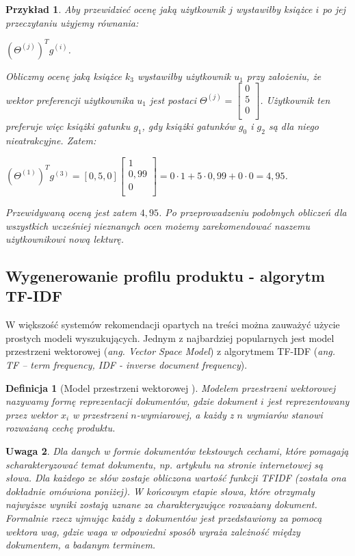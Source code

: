 \documentclass[12pt,a4paper]{report}
\newtheorem{df}{Definicja}[chapter]
\newtheorem{przyklad}{Przykład}[chapter]
\newtheorem{uwaga}[df]{Uwaga}
\begin{document}
\begin{przyklad}
Aby przewidzieć ocenę jaką użytkownik $j$ wystawiłby książce $i$ po jej przeczytaniu użyjemy równania:
\begin{center}
$(\Theta^{(j)})^T g^{(i)}$.
\end{center}
\bigskip
Obliczmy ocenę jaką książce $k_3$ wystawiłby użytkownik $u_1$ przy założeniu, że wektor preferencji użytkownika $u_1$ jest postaci $\Theta^{(j)}= \left[
        \begin{array}{c}
         0 \\
         5 \\
         0 \\
         \end{array}
      \right] $. Użytkownik ten preferuje więc książki gatunku $g_1$, gdy książki gatunków $g_0$ i $g_2$ są dla niego nieatrakcyjne.
Zatem:
\begin{center}
$(\Theta^{(1)})^T g^{(3)} = [0,5,0] \left[
        \begin{array}{c}
         1 \\
         0,99 \\
         0 \\
         \end{array}
      \right] = 0 \cdot 1 + 5 \cdot 0,99 + 0 \cdot 0 = 4,95$.
\end{center}
Przewidywaną oceną jest zatem $4,95$. Po przeprowadzeniu podobnych obliczeń dla wszystkich wcześniej nieznanych ocen możemy zarekomendować naszemu użytkownikowi nową lekturę.
\end{przyklad}
\subsection{Wygenerowanie profilu produktu - algorytm TF-IDF}
W większość systemów rekomendacji opartych na treści można zauważyć użycie prostych modeli wyszukujących. Jednym z najbardziej popularnych jest model przestrzeni wektorowej (\textit{ang. Vector Space Model}) z algorytmem TF-IDF (\textit{ang. TF – term frequency, IDF - inverse document frequency}).

\begin{df}[Model przestrzeni wektorowej {\citep[Sec 3.3.1.1]{rsh}}]
Modelem przestrzeni wektorowej nazywamy formę reprezentacji dokumentów, gdzie dokument $i$ jest reprezentowany przez wektor $x_{i}$ w przestrzeni $n$-wymiarowej, a każdy z $n$ wymiarów stanowi rozważaną cechę produktu. 
\end{df}

\begin{uwaga}
Dla danych w formie dokumentów tekstowych cechami, które pomagają scharakteryzować temat dokumentu, np. artykułu na stronie internetowej są słowa. Dla każdego ze słów zostaje obliczona wartość funkcji TFIDF (została ona dokładnie omówiona poniżej). W końcowym etapie słowa, które otrzymały najwyższe wyniki zostają uznane za charakteryzujące rozważany dokument.
Formalnie rzecz ujmując każdy z dokumentów jest przedstawiony za pomocą wektora wag, gdzie waga w odpowiedni sposób wyraża zależność między dokumentem, a badanym terminem.
\end{uwaga}
\end{document}
